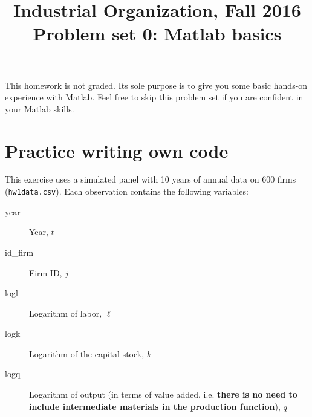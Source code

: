 \documentclass[a4paper, 12pt]{article}
\title{Industrial Organization, Fall 2016\\
Problem set 0: Matlab basics}
\date{}
\begin{document}
\maketitle

This homework is not graded. Its sole purpose is to give you some basic hands-on experience with Matlab. Feel free to skip this problem set if you are confident in your Matlab skills.


\section*{Practice writing own code}

This exercise uses a simulated panel with 10 years of annual data on 600 firms (\texttt{hw1data.csv}). Each observation contains the following variables:
\begin{description}
	\item[year] Year, $t$
	\item[id\_firm] Firm ID, $j$
	\item[logl] Logarithm of labor, $\ell$
	\item[logk] Logarithm of the capital stock, $k$
	\item[logq] Logarithm of output (in terms of value added, i.e. \textbf{there is no need to include intermediate materials in the production function}), $q$
\end{description}
\end{document}
